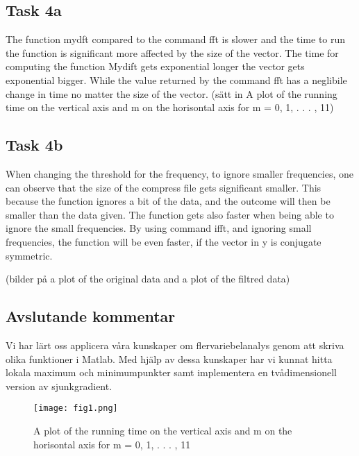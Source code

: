 \subsection{Task 4a}
The function mydft compared to the command fft is slower and the time to run the function is significant more affected by the size of the vector. The time for computing the function Mydift gets exponential longer the vector gets exponential bigger. While the value returned by the command fft has a neglibile change in time no matter the size of the vector. 
(sätt in A plot of the running time on the vertical axis and m on the horisontal axis for m = 0, 1, . . . , 11)
\subsection{Task 4b}
When changing the threshold for the frequency, to ignore smaller frequencies, one can observe that the size of the compress file gets significant smaller. This because the function ignores a bit of the data, and the outcome will then be smaller than the data given. The function gets also faster when being able to ignore the small frequencies. By using command ifft, and ignoring small frequencies, the function will be even faster, if the vector in y is conjugate symmetric.

(bilder på a plot of the original data and a plot of the filtred data) 



\subsection{Avslutande kommentar}
Vi har lärt oss applicera våra kunskaper om flervariebelanalys genom att skriva olika funktioner i Matlab. Med hjälp av dessa kunskaper har vi kunnat hitta lokala maximum och minimumpunkter samt implementera en tvådimensionell version av sjunkgradient.
\begin{figure}[h]
\centering
\texttt{[image: fig1.png]}
\caption{A plot of the running time on the vertical axis and m on the horisontal axis for m = 0, 1, . . . , 11}
\label{fig:my_label}
\end{figure}


\usepackage{mathptmx}


\clearpage
